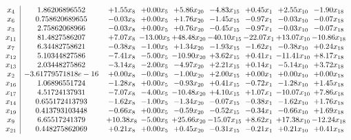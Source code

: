 \documentclass[8pt]{article}
\begin{document}
\[\begin{array}{c| c c@{\hskip 2pt} c@{\hskip 2pt} c@{\hskip 2pt} c@{\hskip 2pt} c@{\hskip 2pt} c@{\hskip 2pt} c@{\hskip 2pt} }
 x_{4}   &  1.86206896552 & +  1.55 x_{8} & +  0.00 x_{5} & +  5.86 x_{20} & -4.83 x_{15} & +  0.45 x_{1} & +  2.55 x_{10} & -1.90 x_{18}\\
 x_{6}   &  0.758620689655 & -0.03 x_{8} & +  0.00 x_{5} & +  1.76 x_{20} & -1.45 x_{15} & -0.97 x_{1} & -0.03 x_{10} & -0.07 x_{18}\\
 x_{3}   &  2.75862068966 & -0.03 x_{8} & +  0.00 x_{5} & +  0.76 x_{20} & -0.45 x_{15} & -0.97 x_{1} & -0.03 x_{10} & -0.07 x_{18}\\
 x_{11}   &  81.4827586207 & +  7.07 x_{8} & -13.00 x_{5} & + 48.48 x_{20} & -40.10 x_{15} & -22.07 x_{1} & + 13.07 x_{10} & -10.86 x_{18}\\
 x_{7}   &  6.34482758621 & -0.38 x_{8} & -1.00 x_{5} & +  1.34 x_{20} & -1.93 x_{15} & -1.62 x_{1} & -0.38 x_{10} & +  0.24 x_{18}\\
 x_{12}   &  5.10344827586 & -7.41 x_{8} & -5.00 x_{5} & -10.90 x_{20} & +  3.62 x_{15} & +  0.41 x_{1} & -11.41 x_{10} & +  8.17 x_{18}\\
 x_{13}   &  2.03448275862 & -3.14 x_{8} & -2.00 x_{5} & -4.97 x_{20} & +  2.21 x_{15} & +  0.14 x_{1} & -5.14 x_{10} & +  3.72 x_{18}\\
 x_{2}   &  -3.61779571818e-16 & +  0.00 x_{8} & -0.00 x_{5} & -1.00 x_{20} & +  2.00 x_{15} & +  0.00 x_{1} & +  0.00 x_{10} & +  0.00 x_{18}\\
 x_{16}   &  1.06896551724 & -1.28 x_{8} & +  0.00 x_{5} & -0.93 x_{20} & +  0.41 x_{15} & -0.72 x_{1} & -1.28 x_{10} & +  1.45 x_{18}\\
 x_{17}   &  4.51724137931 & -7.07 x_{8} & -4.00 x_{5} & -10.48 x_{20} & +  4.10 x_{15} & +  1.07 x_{1} & -10.07 x_{10} & +  7.86 x_{18}\\
 x_{14}   &  0.655172413793 & -1.62 x_{8} & -1.00 x_{5} & -1.34 x_{20} & -0.07 x_{15} & -0.38 x_{1} & -1.62 x_{10} & +  1.76 x_{18}\\
 x_{19}   &  0.413793103448 & -0.66 x_{8} & +  0.00 x_{5} & -0.59 x_{20} & -0.52 x_{15} & -0.34 x_{1} & -0.66 x_{10} & +  1.69 x_{18}\\
 x_{9}   &  6.65517241379 & + 10.38 x_{8} & -5.00 x_{5} & + 25.66 x_{20} & -15.07 x_{15} & +  8.62 x_{1} & + 17.38 x_{10} & -12.24 x_{18}\\
 x_{21}   &  0.448275862069 & +  0.21 x_{8} & +  0.00 x_{5} & +  0.45 x_{20} & -0.31 x_{15} & -0.21 x_{1} & +  0.21 x_{10} & +  0.41 x_{18}\\

\end{array}\]
\end{document}

